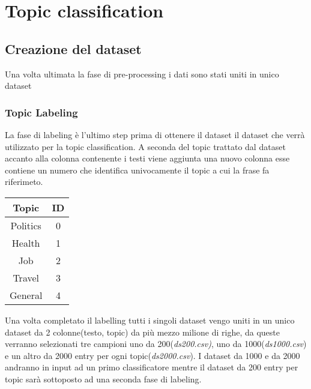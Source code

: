 \section{Topic classification}

\subsection{Creazione del dataset}
Una volta ultimata la fase di pre-processing i dati sono stati uniti in unico dataset
\subsubsection{Topic Labeling}
\label{sssec:topiclabeling}
La fase di labeling è l'ultimo step prima di ottenere il dataset il dataset che verrà utilizzato per la topic classification. A seconda del topic trattato dal dataset  accanto alla colonna contenente i testi viene aggiunta una nuovo colonna esse contiene un numero che identifica univocamente il topic a cui la frase fa riferimeto.
\FloatBarrier
\begin{table}[h]
\centering
\begin{tabular}{|c|c|}
\hline
\textbf{Topic} & \textbf{ID} \\ \hline
Politics & 0 \\ \hline
Health & 1 \\ \hline
Job & 2 \\ \hline
Travel & 3 \\ \hline
General & 4 \\ \hline
\end{tabular}
\end{table}
Una volta completato il labelling tutti i singoli dataset vengo uniti in un unico dataset da 2 colonne(testo, topic) da più mezzo milione di righe, da queste verranno selezionati tre campioni uno da 200(\textit{ds200.csv)}, uno da 1000(\textit{ds1000.csv}) e un altro da 2000 entry per ogni topic(\textit{ds2000.csv}).\newline
I dataset da 1000 e da 2000 andranno in input ad un primo classificatore mentre il dataset da 200 entry per topic sarà sottoposto ad una seconda fase di labeling.

